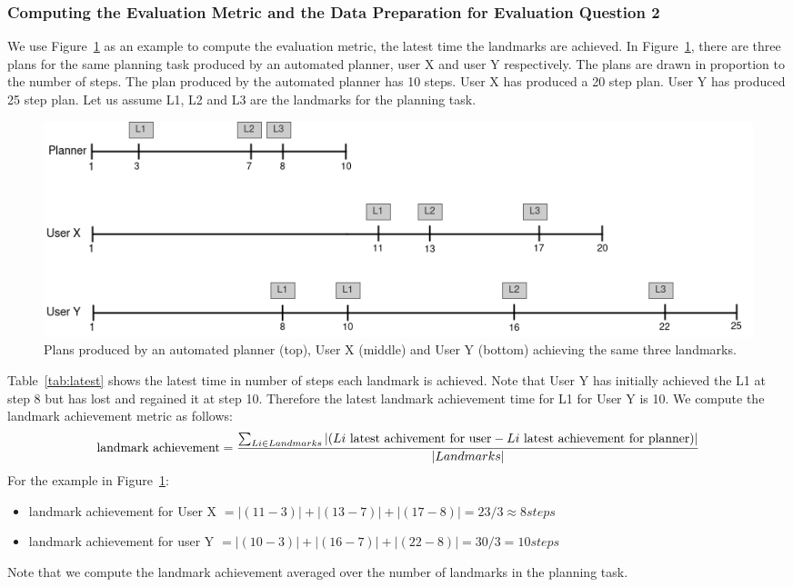 \subsubsection{Computing the Evaluation Metric and the Data Preparation for Evaluation Question 2}
We use Figure~\ref{fig:latest} as an example to compute the evaluation metric, the latest time the landmarks are achieved.
In Figure~\ref{fig:latest}, there are three plans for the same planning task produced by an automated planner, user X and user Y respectively.
The plans are drawn in proportion to the number of steps.
The plan produced by the automated planner has 10 steps.
User X has produced a 20 step plan.
User Y has produced 25 step plan.
Let us assume L1, L2 and L3 are the landmarks for the planning task.
\begin{figure}[tpb]
  \centering
\includegraphics[width=\columnwidth]{img/latest.png}
  \caption{Plans produced by an automated planner (top), User X (middle) and User Y (bottom) achieving the same three landmarks.}
  \label{fig:latest}
\end{figure}
Table~\ref{tab:latest} shows the latest time in number of steps each landmark is achieved.
Note that User Y has initially achieved the L1 at step 8 but has lost and regained it at step 10.
Therefore the latest landmark achievement time for L1 for User Y is 10.
We compute the landmark achievement metric as follows:
\begin{equation}
\textup{landmark achievement} = \frac{\sum_{Li \in Landmarks} \left | (Li \textup{ latest achivement for user} - Li  \textup{ latest achievement for planner}) \right |}{|Landmarks|} 
\end{equation}
For the example in Figure~\ref{fig:latest}:
\begin{itemize}
\item landmark achievement for User X $= |(11-3)| + |(13-7)| + |(17-8)| = 23/3 \approx 8 steps$
\item landmark achievement for user Y $=|(10-3)| + |(16-7)| + |(22-8)|=30/3 = 10 steps$
\end{itemize}
Note that we compute the landmark achievement averaged over the number of landmarks in the planning task.
